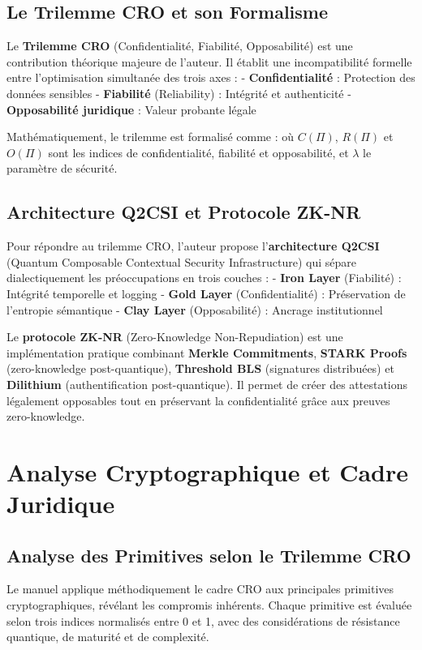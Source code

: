 \documentclass[12pt, a4paper]{article}
\begin{document}
\subsection{Le Trilemme CRO et son Formalisme}
Le \textbf{Trilemme CRO} (Confidentialité, Fiabilité, Opposabilité) est une contribution théorique majeure de l'auteur. Il établit une incompatibilité formelle entre l'optimisation simultanée des trois axes :
- \textbf{Confidentialité} : Protection des données sensibles
- \textbf{Fiabilité} (Reliability) : Intégrité et authenticité
- \textbf{Opposabilité juridique} : Valeur probante légale

Mathématiquement, le trilemme est formalisé comme :
où \( C(\Pi) \), \( R(\Pi) \) et \( O(\Pi) \) sont les indices de confidentialité, fiabilité et opposabilité, et \( \lambda \) le paramètre de sécurité.

\subsection{Architecture Q2CSI et Protocole ZK-NR}
Pour répondre au trilemme CRO, l'auteur propose l'\textbf{architecture Q2CSI} (Quantum Composable Contextual Security Infrastructure) qui sépare dialectiquement les préoccupations en trois couches :
- \textbf{Iron Layer} (Fiabilité) : Intégrité temporelle et logging
- \textbf{Gold Layer} (Confidentialité) : Préservation de l'entropie sémantique
- \textbf{Clay Layer} (Opposabilité) : Ancrage institutionnel

Le \textbf{protocole ZK-NR} (Zero-Knowledge Non-Repudiation) est une implémentation pratique combinant \textbf{Merkle Commitments}, \textbf{STARK Proofs} (zero-knowledge post-quantique), \textbf{Threshold BLS} (signatures distribuées) et \textbf{Dilithium} (authentification post-quantique). Il permet de créer des attestations légalement opposables tout en préservant la confidentialité grâce aux preuves zero-knowledge.

\section{Analyse Cryptographique et Cadre Juridique}

\subsection{Analyse des Primitives selon le Trilemme CRO}
Le manuel applique méthodiquement le cadre CRO aux principales primitives cryptographiques, révélant les compromis inhérents. Chaque primitive est évaluée selon trois indices normalisés entre 0 et 1, avec des considérations de résistance quantique, de maturité et de complexité.
\end{document}

